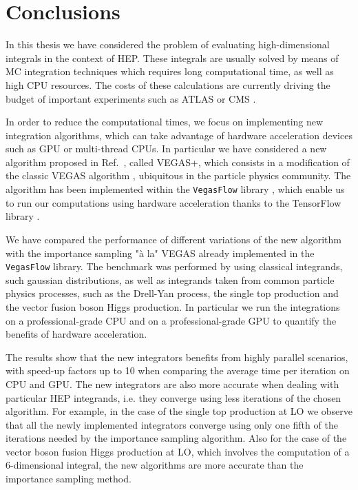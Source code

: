 \documentclass[../main/main.tex]{subfiles}
\begin{document}
\chapter{Conclusions}

In this thesis we have considered the problem of evaluating high-dimensional integrals in the context of HEP.
These integrals are usually solved by means of MC integration techniques which requires long computational time, as well as high CPU resources.
The costs of these calculations are currently driving the budget of important experiments such as ATLAS or CMS \cite{Buckley:2019wov}.

In order to reduce the computational times, we focus on implementing new integration algorithms, which can take advantage of hardware acceleration devices such as GPU or multi-thread CPUs.
In particular we have considered a new algorithm proposed in Ref.~\cite{Lepage:2020tgj}, called VEGAS+,  which consists in a modification of the classic VEGAS algorithm \cite{Lepage:1977sw}, ubiquitous in the particle physics community.
The algorithm has been implemented within the \texttt{VegasFlow} library \cite{Carrazza:2020rdn}, which enable us to run our computations using hardware acceleration thanks to the TensorFlow library
\cite{tensorflow2015-whitepaper}. 

We have compared the performance of different variations of the new algorithm with the importance sampling "à la" VEGAS already implemented in the \texttt{VegasFlow} library. The benchmark was performed by using classical integrands, such gaussian distributions, as well as integrands taken from common particle physics processes, such as the Drell-Yan process, the single top production and the vector fusion boson Higgs production. In particular we run the integrations on a professional-grade CPU and on a professional-grade GPU to quantify the benefits of hardware acceleration.

The results show that the new integrators benefits from highly parallel scenarios, with speed-up factors up to 10 when comparing the average time per iteration on CPU and GPU. The new integrators are also more accurate when dealing with particular HEP integrands, i.e. they converge using less iterations of the chosen algorithm. For example, 
in the case of the single top production at LO we observe that all the newly implemented integrators converge using only one fifth of the iterations needed by the importance sampling algorithm. Also for the case of the vector boson fusion Higgs production at LO, which involves the computation of a 6-dimensional integral, the new algorithms are more accurate than the importance sampling method.
\end{document}
